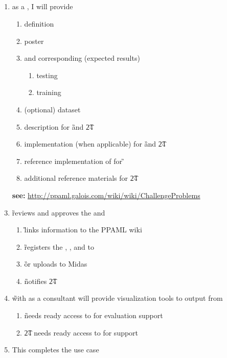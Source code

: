 \documentclass[8pt,letterpaper]{article} %
\newenvironment{slimlist}{
  \begin{itemize}
    \setlength{\topsep}{0pt}
    \setlength{\itemsep}{1pt}
    \setlength{\parsep}{0pt}
    \setlength{\parskip}{0pt}
}{\end{itemize}}
\newenvironment{mitemize}[1]{
  \subsection*{#1}
  \begin{slimlist}
}{
\end{slimlist}
\vspace{1em}
\pagebreak
}
\begin{document}
\begin{mitemize}{\de}
\begin{enumerate}
  \item as a \de, I will provide 
    \begin{enumerate}
    \item \cp definition
    \item \cp poster 
    \item \ds and corresponding \gs (expected results)
      \begin{enumerate}
      \item testing
      \item training
      \end{enumerate}
    \item (optional) dataset  \gen
    \item \tev description for \G and \t24
    \item \tev implementation (when applicable) for \G and \t24
    \item reference implementation of \sol for \G
    \item additional reference materials for \t24 
    \end{enumerate}
  \item[{\bf see:}] \url{http://ppaml.galois.com/wiki/wiki/ChallengeProblems}
  \item \G reviews and approves the \cp and 
    \begin{enumerate}
    \item \G links \cp information to the PPAML wiki
    \item \G registers the \ds, \cp, and \tev to \ptk
    \item \G or \de uploads \ds to Midas
    \item \G notifies \t24
    \end{enumerate}
  \item \G with \de as a consultant will provide visualization tools to \rep output from 
    \begin{enumerate}
    \item \G needs ready access to \de for evaluation support
    \item \t24 needs ready access to \de for \cp support
    \end{enumerate}
  \item This completes the use case
  \end{enumerate}
\end{mitemize}
\end{document}
